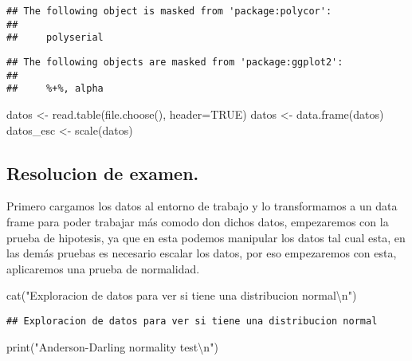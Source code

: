 \documentclass[
]{article}
\newenvironment{Shaded}{\begin{snugshade}}{\end{snugshade}}
\newcommand{\AttributeTok}[1]{\textcolor[rgb]{0.77,0.63,0.00}{#1}}
\newcommand{\ConstantTok}[1]{\textcolor[rgb]{0.00,0.00,0.00}{#1}}
\newcommand{\FunctionTok}[1]{\textcolor[rgb]{0.00,0.00,0.00}{#1}}
\newcommand{\NormalTok}[1]{#1}
\newcommand{\OtherTok}[1]{\textcolor[rgb]{0.56,0.35,0.01}{#1}}
\newcommand{\SpecialCharTok}[1]{\textcolor[rgb]{0.00,0.00,0.00}{#1}}
\newcommand{\StringTok}[1]{\textcolor[rgb]{0.31,0.60,0.02}{#1}}
\begin{document}
\begin{verbatim}
## The following object is masked from 'package:polycor':
## 
##     polyserial
\end{verbatim}

\begin{verbatim}
## The following objects are masked from 'package:ggplot2':
## 
##     %+%, alpha
\end{verbatim}

\begin{Shaded}
\begin{Highlighting}[]
\NormalTok{datos }\OtherTok{\textless{}{-}} \FunctionTok{read.table}\NormalTok{(}\FunctionTok{file.choose}\NormalTok{(), }\AttributeTok{header=}\ConstantTok{TRUE}\NormalTok{)}
\NormalTok{datos }\OtherTok{\textless{}{-}} \FunctionTok{data.frame}\NormalTok{(datos)}
\NormalTok{datos\_esc }\OtherTok{\textless{}{-}} \FunctionTok{scale}\NormalTok{(datos)}
\end{Highlighting}
\end{Shaded}

\hypertarget{resolucion-de-examen.}{%
\subsection{Resolucion de examen.}\label{resolucion-de-examen.}}

Primero cargamos los datos al entorno de trabajo y lo transformamos a un
data frame para poder trabajar más comodo don dichos datos, empezaremos
con la prueba de hipotesis, ya que en esta podemos manipular los datos
tal cual esta, en las demás pruebas es necesario escalar los datos, por
eso empezaremos con esta, aplicaremos una prueba de normalidad.

\begin{Shaded}
\begin{Highlighting}[]
  \FunctionTok{cat}\NormalTok{(}\StringTok{"Exploracion de datos para ver si tiene una distribucion normal}\SpecialCharTok{\textbackslash{}n}\StringTok{"}\NormalTok{)}
\end{Highlighting}
\end{Shaded}

\begin{verbatim}
## Exploracion de datos para ver si tiene una distribucion normal
\end{verbatim}

\begin{Shaded}
\begin{Highlighting}[]
  \FunctionTok{print}\NormalTok{(}\StringTok{"Anderson{-}Darling normality test}\SpecialCharTok{\textbackslash{}n}\StringTok{"}\NormalTok{)}
\end{Highlighting}
\end{Shaded}
\end{document}
